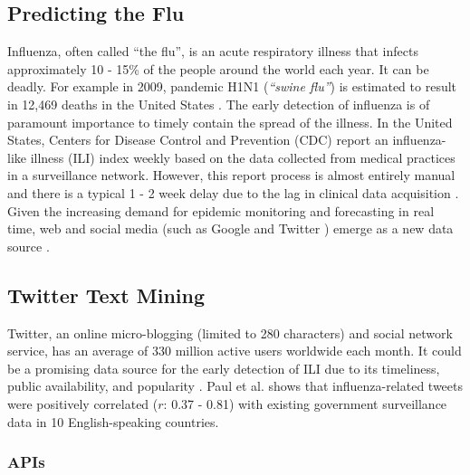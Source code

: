 \documentclass[12pt, oneside]{article}
\begin{document}
\subsection{Predicting the Flu}

Influenza, often called ``the flu'', is an acute respiratory illness that infects approximately 10 - 15\% of the people around the world each year.
It can be deadly. For example in 2009, pandemic H1N1 (\textit{``swine flu''}) is estimated to result in 12,469 deaths in the United States \cite{H1N1}.
The early detection of influenza is of paramount importance to timely contain the spread of the illness. In the United States, Centers for Disease Control and Prevention (CDC)
report an influenza-like illness (ILI) index weekly based on the data collected from medical practices in a surveillance network. However, this report process is almost
entirely manual and there is a typical 1 - 2 week delay due to the lag in clinical data acquisition \cite{TwitterSeasonalFlu}.
Given the increasing demand for epidemic monitoring and forecasting in real time, web and social media (such as Google \cite{GoogleFlu} and Twitter \cite{TwitterFlu})
emerge as a new data source \cite{MediaFlu}.

\subsection{Twitter Text Mining}

Twitter, an online micro-blogging (limited to 280 characters) and social network service, has an average of 330 million active users worldwide \cite{TwitterUser} each month.
It could be a promising data source for the early detection of ILI due to its timeliness, public availability, and popularity \cite{TwitterAnalyzeMessage}.
Paul et al. \cite{TwitterWorldWide} shows that influenza-related tweets were positively correlated ($r$: 0.37 - 0.81) with existing government surveillance data
in 10 English-speaking countries.

\subsubsection{APIs}
\label{subsubsec:api}
\end{document}
